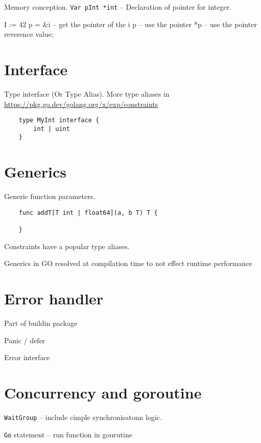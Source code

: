 \documentclass[12pt]{article}
\begin{document}
Memory conception.
\texttt{Var pInt *int} -- Declaration of pointer for integer.

I := 42
p = \&i -- get the pointer of the i
p       -- use the pointer
*p      -- use the pointer reverence value;
\section{Interface}

Type interface (Or Type Alias). More type aliases in
\href{constraint package}{https://pkg.go.dev/golang.org/x/exp/constraints}

\begin{lstlisting}
    type MyInt interface {
        int | uint
    }
\end{lstlisting}

\section{Generics}
\begin{paracol}{2} \begin{leftcolumn}
Generic function parameters.
\begin{lstlisting}
    func addT[T int | float64](a, b T) T {

    }
\end{lstlisting}

Constraints have a popular type aliases.

\end{leftcolumn}\begin{rightcolumn}
Generics in GO resolved at compilation time to not effect runtime performance
\end{rightcolumn}
\end{paracol}


\section{Error handler}
Part of buildin package

Panic / defer

Error interface

\section{Concurrency and goroutine}

\texttt{WaitGroup} -- include cimple synchronisatonn logic.

\texttt{Go} statement -- run function in gourutine
\end{document}
